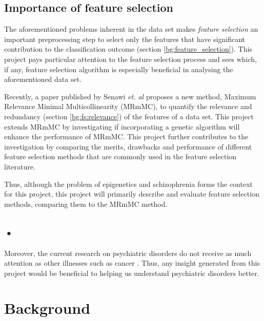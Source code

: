 \documentclass[12pt, twoside, a4paper]{report}
\begin{document}


\section{Importance of feature selection}
The aforementioned problems inherent in the data set makes \textit{feature selection} an important preprocessing step to select only the features that have significant contribution to the classification outcome (section \ref{bg:feature_selection}). This project pays particular attention to the feature selection process and sees which, if any, feature selection algorithm is especially beneficial in analysing the aforementioned data set.

Recently, a paper published by Senawi \textit{et. al} \cite{RefWorks:187} proposes a new method, Maximum Relevance Minimal Multicollinearity (MRmMC), to quantify the relevance and redundancy (section \ref{bg:fs:relevance}) of the features of a data set.
This project extends MRmMC by investigating if incorporating a genetic algorithm will enhance the performance of MRmMC. This project further contributes to the investigation by comparing the merits, drawbacks and performance of different feature selection methods that are commonly used in the feature selection literature.

Thus, although the problem of epigenetics and schizophrenia forms the context for this project, this project will primarily describe and evaluate feature selection methods, comparing them to the MRmMC method. 

\section{•}
Moreover, the current research on psychiatric disorders do not receive as much attention as other illnesses such as cancer \cite{RefWorks:82}. Thus, any insight generated from this project would be beneficial to helping us understand psychiatric disorders better.


\chapter{Background}
\end{document}
